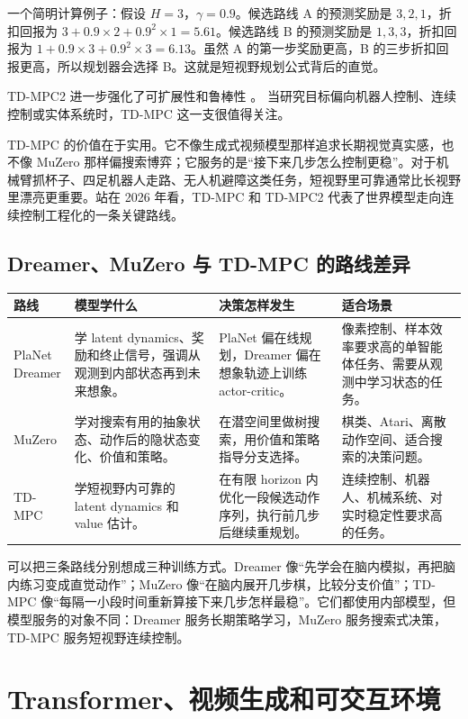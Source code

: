 \documentclass[11pt,a4paper]{ctexart}
\begin{document}
一个简明计算例子：假设 $H=3$，$\gamma=0.9$。候选路线 A 的预测奖励是 $3,2,1$，折扣回报为 $3+0.9\times2+0.9^2\times1=5.61$。候选路线 B 的预测奖励是 $1,3,3$，折扣回报为 $1+0.9\times3+0.9^2\times3=6.13$。虽然 A 的第一步奖励更高，B 的三步折扣回报更高，所以规划器会选择 B。这就是短视野规划公式背后的直觉。

TD-MPC2 进一步强化了可扩展性和鲁棒性 \cite{hansen2023tdmpc2}。
当研究目标偏向机器人控制、连续控制或实体系统时，TD-MPC 这一支很值得关注。

TD-MPC 的价值在于实用。它不像生成式视频模型那样追求长期视觉真实感，也不像 MuZero 那样偏搜索博弈；它服务的是“接下来几步怎么控制更稳”。对于机械臂抓杯子、四足机器人走路、无人机避障这类任务，短视野里可靠通常比长视野里漂亮更重要。站在 2026 年看，TD-MPC 和 TD-MPC2 代表了世界模型走向连续控制工程化的一条关键路线。

\subsection{Dreamer、MuZero 与 TD-MPC 的路线差异}

\begin{longtable}{p{} p{} p{} p{}}
\toprule
路线 & 模型学什么 & 决策怎样发生 & 适合场景 \\
\midrule
\shortstack[l]{PlaNet\\Dreamer} & 学 latent dynamics、奖励和终止信号，强调从观测到内部状态再到未来想象。 & PlaNet 偏在线规划，Dreamer 偏在想象轨迹上训练 actor-critic。 & 像素控制、样本效率要求高的单智能体任务、需要从观测中学习状态的任务。 \\
MuZero & 学对搜索有用的抽象状态、动作后的隐状态变化、价值和策略。 & 在潜空间里做树搜索，用价值和策略指导分支选择。 & 棋类、Atari、离散动作空间、适合搜索的决策问题。 \\
TD-MPC & 学短视野内可靠的 latent dynamics 和 value 估计。 & 在有限 horizon 内优化一段候选动作序列，执行前几步后继续重规划。 & 连续控制、机器人、机械系统、对实时稳定性要求高的任务。 \\
\bottomrule
\end{longtable}

可以把三条路线分别想成三种训练方式。Dreamer 像“先学会在脑内模拟，再把脑内练习变成直觉动作”；MuZero 像“在脑内展开几步棋，比较分支价值”；TD-MPC 像“每隔一小段时间重新算接下来几步怎样最稳”。它们都使用内部模型，但模型服务的对象不同：Dreamer 服务长期策略学习，MuZero 服务搜索式决策，TD-MPC 服务短视野连续控制。

\section{Transformer、视频生成和可交互环境}
\end{document}
